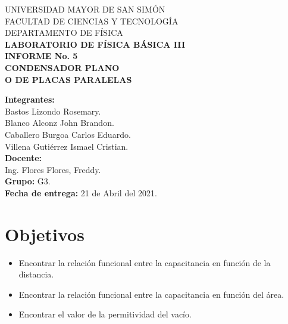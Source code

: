 \documentclass[letter,11pt]{article}
\begin{document}
\begin{titlepage}
\begin{center}
{\Large UNIVERSIDAD MAYOR DE SAN SIMÓN}\\
\vspace*{0.15cm}
{\large FACULTAD DE CIENCIAS Y TECNOLOGÍA}\\
\vspace*{0.10cm}
DEPARTAMENTO DE FÍSICA\\
\vspace*{3.0cm}
{\Large \textbf{LABORATORIO DE FÍSICA BÁSICA III}}\\
\vspace*{0.3cm}
{\Large \textbf{INFORME No. 5}}\\
\vspace*{3.5cm}
{\Large \textbf{CONDENSADOR PLANO \\O DE PLACAS PARALELAS}}\\
\end{center}

\vspace*{5.8cm}
\leftskip=7.95cm
\noindent
\textbf{Integrantes:}\\
Bastos Lizondo Rosemary.\\
Blanco Alconz John Brandon.\\
Caballero Burgoa Carlos Eduardo.\\
Villena Gutiérrez Ismael Cristian.\\
\newline
\textbf{Docente:}\\
Ing. Flores Flores, Freddy.\\
\newline
\textbf{Grupo:} G3.\\
\textbf{Fecha de entrega:} 21 de Abril del 2021.\\

\end{titlepage}

\section{Objetivos}
\begin{itemize}
\item Encontrar la relación funcional entre la capacitancia en función de la
    distancia.
\item Encontrar la relación funcional entre la capacitancia en función del área.
\item Encontrar el valor de la permitividad del vacío.
\end{itemize}
\end{document}
